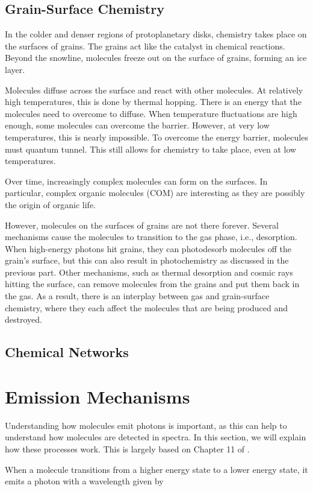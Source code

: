 \documentclass[oneside, single, authoryear, semicolon, 12pt]{lion-msc}
\newcommand{\4}{$_4$}
\newcommand{\3}{$_3$}
\newcommand{\2}{$_2$}
\begin{document}
\subsection{Grain-Surface Chemistry}
In the colder and denser regions of protoplanetary disks, chemistry takes place on the surfaces of grains.  The grains act like the catalyst in chemical reactions. Beyond the snowline, molecules freeze out on the surface of grains, forming an ice layer. 

Molecules diffuse across the surface and react with other molecules. At relatively high temperatures, this is done by thermal hopping. There is an energy that the molecules need to overcome to diffuse. When temperature fluctuations are high enough, some molecules can overcome the barrier. However, at very low temperatures, this is nearly impossible. To overcome the energy barrier, molecules must quantum tunnel. This still allows for chemistry to take place, even at low temperatures. 

Over time, increasingly complex molecules can form on the surfaces. In particular, complex organic molecules (COM) are interesting as they are possibly the origin of organic life. 

However, molecules on the surfaces of grains are not there forever. Several mechanisms cause the molecules to transition to the gas phase, i.e., desorption. When high-energy photons hit grains, they can photodesorb molecules off the grain's surface, but this can also result in photochemistry as discussed in the previous part. Other mechanisms, such as thermal desorption and cosmic rays hitting the surface, can remove molecules from the grains and put them back in the gas. As a result, there is an interplay between gas and grain-surface chemistry, where they each affect the molecules that are being produced and destroyed.

\subsection{Chemical Networks}
\section{Emission Mechanisms}
Understanding how molecules emit photons is important, as this can help to understand how molecules are detected in spectra. In this section, we will explain how these processes work. This is largely based on Chapter 11 of \cite{1979rpa..book.....R}. 

When a molecule transitions from a higher energy state to a lower energy state, it emits a photon with a wavelength given by
\end{document}

